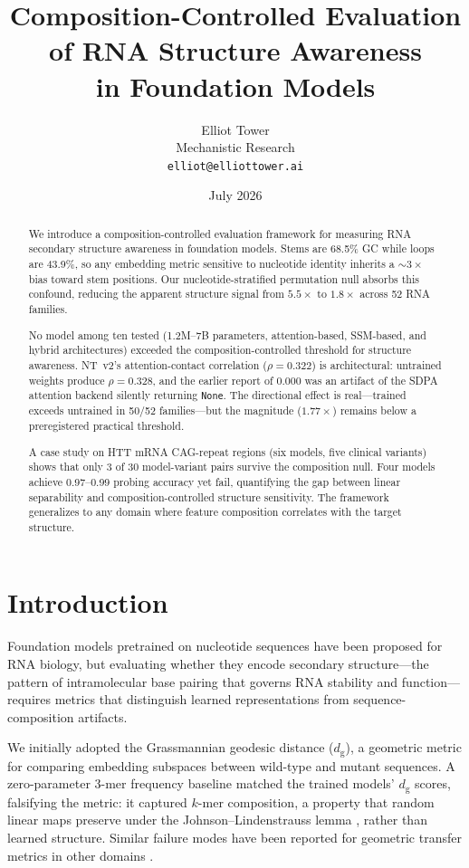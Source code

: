 \documentclass[11pt]{article}
\title{Composition-Controlled Evaluation of RNA Structure Awareness\\
  in Foundation Models}
\author{Elliot Tower\\
  Mechanistic Research\\
  \texttt{elliot@elliottower.ai}}
\date{July 2026}
\newcommand{\dg}{d_{\mathrm{g}}}
\begin{document}
\maketitle

\begin{abstract}
We introduce a composition-controlled evaluation framework for
measuring RNA secondary structure awareness in foundation models.
Stems are 68.5\% GC while loops are 43.9\%, so any embedding metric
sensitive to nucleotide identity inherits a ${\sim}3\times$ bias toward
stem positions.  Our nucleotide-stratified permutation null absorbs
this confound, reducing the apparent structure signal from
$5.5\times$ to $1.8\times$ across 52 RNA families.

No model among ten tested (1.2M--7B parameters, attention-based,
SSM-based, and hybrid architectures) exceeded the composition-controlled
threshold for structure awareness.  NT~v2's attention-contact
correlation ($\rho = 0.322$) is architectural: untrained weights
produce $\rho = 0.328$, and the earlier report of $0.000$ was an
artifact of the SDPA attention backend silently returning
\texttt{None}.  The directional effect is real---trained exceeds
untrained in 50/52 families---but the magnitude ($1.77\times$) remains
below a preregistered practical threshold.

A case study on HTT mRNA CAG-repeat regions (six models, five clinical
variants) shows that only 3 of 30 model-variant pairs survive the
composition null.  Four models achieve 0.97--0.99 probing accuracy yet
fail, quantifying the gap between linear separability and
composition-controlled structure sensitivity.  The framework
generalizes to any domain where feature composition correlates with
the target structure.
\end{abstract}


\section{Introduction}
\label{sec:intro}

Foundation models pretrained on nucleotide sequences have been
proposed for RNA biology, but evaluating whether they encode secondary
structure---the pattern of intramolecular base pairing that governs
RNA stability and function---requires metrics that distinguish learned
representations from sequence-composition artifacts.

We initially adopted the Grassmannian geodesic distance ($\dg$), a
geometric metric for comparing embedding subspaces between wild-type
and mutant sequences.  A zero-parameter 3-mer frequency baseline
matched the trained models' $\dg$ scores, falsifying the metric: it
captured $k$-mer composition, a property that random linear maps
preserve under the Johnson--Lindenstrauss lemma
\citep{johnson1984extensions}, rather than learned structure.  Similar
failure modes have been reported for geometric transfer metrics in
other domains \citep{tower2026boundary}.
\end{document}
